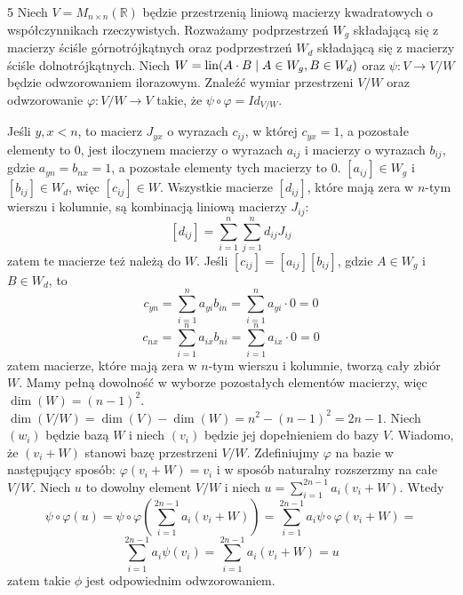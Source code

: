 \documentclass{../note}
\begin{document}
\begin{zadanie}{5}
Niech $V=M_{n\times n}(\mathbb{R})$ będzie przestrzenią liniową macierzy kwadratowych o współczynnikach rzeczywistych. Rozważamy podprzestrzeń $W_{g}$ składającą się z macierzy ściśle górnotrójkątnych oraz podprzestrzeń $W_{d}$ składającą się z macierzy ściśle dolnotrójkątnych.
Niech $W=\operatorname{lin}(A\cdot B \mid A\in W_{g}, B\in W_{d})$ oraz $\psi:V\rightarrow V/W$ będzie odwzorowaniem ilorazowym.
Znaleźć wymiar przestrzeni $V/W$ oraz odwzorowanie $\varphi:V/W\rightarrow V$ takie, że $\psi\circ\varphi=Id_{V/W}$.
\end{zadanie}
\begin{rozwiazanie}
Jeśli $y, x < n$, to macierz $J_{yx}$ o wyrazach $c_{ij}$, w której $c_{yx} = 1$, a pozostałe elementy to 0, jest iloczynem macierzy o wyrazach $a_{ij}$ i macierzy o wyrazach $b_{ij}$, gdzie $a_{yn} = b_{nx} = 1$, a pozostałe elementy tych macierzy to 0. $[a_{ij}] \in W_g$ i $[b_{ij}] \in W_d$, więc $[c_{ij}] \in W$. Wszystkie macierze $[d_{ij}]$, które mają zera w $n$-tym wierszu i kolumnie, są kombinacją liniową macierzy $J_{ij}$:
\[[d_{ij}] = \sum_{i=1}^{n}\sum_{j=1}^{n} d_{ij}J_{ij}\]
zatem te macierze też należą do $W$. Jeśli $[c_{ij}] = [a_{ij}][b_{ij}]$, gdzie $A \in W_g$ i $B \in W_d$, to 
\[c_{yn} = \sum_{i=1}^{n} a_{yi}b_{in} = \sum_{i=1}^{n} a_{yi} \cdot 0 = 0\]
\[c_{nx} = \sum_{i=1}^{n} a_{ix}b_{ni} = \sum_{i=1}^{n} a_{ix} \cdot 0 = 0\]
zatem macierze, które mają zera w $n$-tym wierszu i kolumnie, tworzą cały zbiór $W$. Mamy pełną dowolność w wyborze pozostałych elementów macierzy, więc $\dim(W) = (n-1)^2$. $\dim(V/W) = \dim(V) - \dim(W) = n^2 - (n-1)^2 = 2n - 1$. Niech $(w_i)$ będzie bazą $W$ i niech $(v_i)$ będzie jej dopełnieniem do bazy $V$. Wiadomo, że $(v_i + W)$ stanowi bazę przestrzeni $V/W$. Zdefiniujmy $\varphi$ na bazie w następujący sposób: $\varphi(v_i + W) = v_i$ i w sposób naturalny rozszerzmy na całe $V / W$. Niech $u$ to dowolny element $V / W$ i niech $u = \sum_{i=1}^{2n-1}a_i(v_i + W)$. Wtedy
\[\psi\circ\varphi(u) = \psi\circ\varphi\left(\sum_{i=1}^{2n-1}a_i(v_i + W)\right) = \sum_{i=1}^{2n-1}a_i\psi\circ\varphi(v_i + W) =\]\[ \sum_{i=1}^{2n-1}a_i\psi(v_i) = \sum_{i=1}^{2n-1}a_i(v_i + W) = u\]
zatem takie $\phi$ jest odpowiednim odwzorowaniem.
\end{rozwiazanie}
\end{document}
